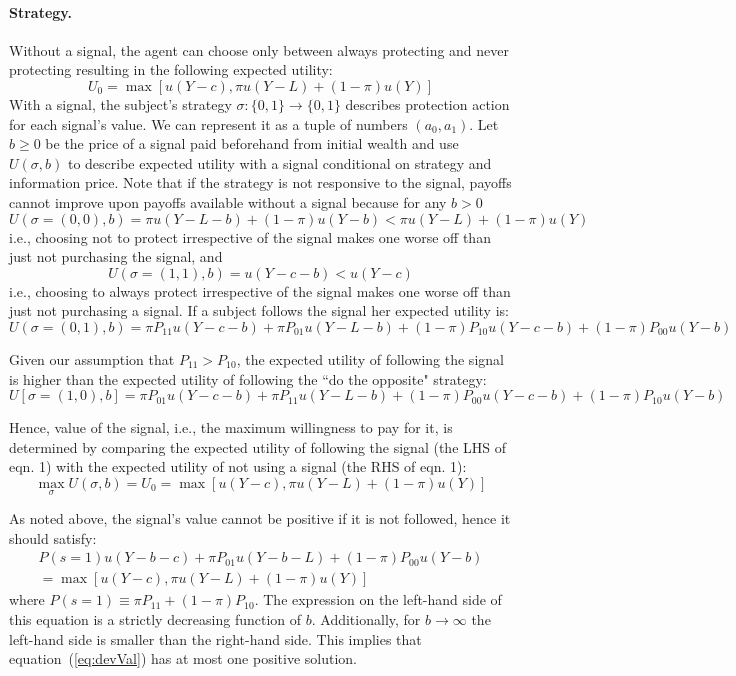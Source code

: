 \documentclass[12pt,a4paper]{article}
\begin{document}
\paragraph{Strategy.} Without a signal, the agent can choose only between always protecting and never protecting resulting in the following expected utility:
\[
U_0=\max[u(Y-c),\pi u(Y-L)+(1-\pi) u(Y)]
\]
With a signal, the subject's  strategy $\sigma:\{0,1\}\to\{0,1\}$ describes protection action for each signal's value.  We can represent it as a tuple of numbers $(a_0,a_1)$. Let $b\geq 0$ be the price of a signal paid beforehand from initial wealth and use $U(\sigma, b)$ to describe expected utility with a signal conditional on strategy and information price. Note that if the strategy is not responsive to the signal, payoffs cannot improve upon payoffs available without a signal because for any \(b>0\)\\
\[U(\sigma=(0,0),b)=\pi u(Y-L-b)+(1-\pi) u(Y-b)<\pi u(Y-L)+(1-\pi) u(Y)\]
i.e., choosing not to protect irrespective of the signal makes one worse off than just not purchasing the signal, and
\[U(\sigma=(1,1),b)=u(Y-c-b) <u(Y-c) \]
i.e., choosing to always protect irrespective of the signal makes one worse off than just not purchasing a signal.  If a subject follows the signal her expected utility is:
\[
U(\sigma=(0,1),b)=\pi P_{11}u(Y-c-b)+\pi P_{01}u(Y-L-b)+(1-\pi)P_{10}u(Y-c-b)+(1-\pi)P_{00}u(Y-b)
\]

Given our assumption that $P_{11}>P_{10}$, the expected utility of following the signal is higher than the expected utility of following the ``do the opposite" strategy:
 \[
U[\sigma=(1,0),b]=\pi P_{01}u(Y-c-b)+\pi P_{11}u(Y-L-b)+(1-\pi)P_{00}u(Y-c-b)+(1-\pi)P_{10}u(Y-b)
\]

Hence, value of the signal, i.e., the maximum willingness to pay for it, is determined by comparing the expected utility of following the signal (the LHS of eqn. 1) with the expected utility of not using a signal (the RHS of eqn. 1):
\begin{equation}
\max_\sigma U(\sigma,b)=U_0=\max[u(Y-c),\pi u(Y-L)+(1-\pi) u(Y)]
\end{equation}

As noted above, the signal's value cannot be positive if it is not followed, hence it should satisfy:
\begin{equation}\label{eq:devVal}
\begin{split}
P(s=1)u(Y-b-c)+\pi P_{01}u(Y-b-L)+(1-\pi)P_{00}u(Y-b)\\=\max[u(Y-c),\pi u(Y-L)+(1-\pi) u(Y)] 
\end{split}
\end{equation}
where $P(s=1)\equiv \pi P_{11}+(1-\pi)P_{10}$. The expression on the left-hand side of this equation is a strictly decreasing function of $b$. Additionally, for $b\rightarrow \infty$ the left-hand side is smaller than the right-hand side. This implies that equation~(\ref{eq:devVal}) has at most one positive solution.
\end{document}
